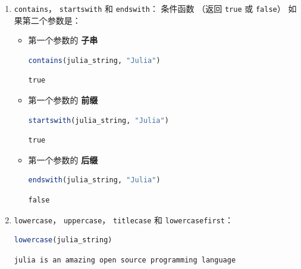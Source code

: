 \documentclass[
  notoc %
]{tufte-book}
\newcommand{\passthrough}[1]{#1}
\begin{document}
\begin{enumerate}
\def\labelenumi{\arabic{enumi}.}
\item
  \passthrough{\lstinline!contains!}，
  \passthrough{\lstinline!startswith!} 和
  \passthrough{\lstinline!endswith!}： 条件函数 （返回
  \passthrough{\lstinline!true!} 或 \passthrough{\lstinline!false!}）
  如果第二个参数是：

  \begin{itemize}
  \item
    第一个参数的 \textbf{子串}

    \begin{lstlisting}[language=Julia]
    contains(julia_string, "Julia")
    \end{lstlisting}

    \begin{lstlisting}[language=Output]
    true
    \end{lstlisting}
  \item
    第一个参数的 \textbf{前缀}

    \begin{lstlisting}[language=Julia]
    startswith(julia_string, "Julia")
    \end{lstlisting}

    \begin{lstlisting}[language=Output]
    true
    \end{lstlisting}
  \item
    第一个参数的 \textbf{后缀}

    \begin{lstlisting}[language=Julia]
    endswith(julia_string, "Julia")
    \end{lstlisting}

    \begin{lstlisting}[language=Output]
    false
    \end{lstlisting}
  \end{itemize}
\item
  \passthrough{\lstinline!lowercase!}，
  \passthrough{\lstinline!uppercase!}，
  \passthrough{\lstinline!titlecase!} 和
  \passthrough{\lstinline!lowercasefirst!}：

  \begin{lstlisting}[language=Julia]
  lowercase(julia_string)
  \end{lstlisting}

  \begin{lstlisting}[language=Output]
  julia is an amazing open source programming language
  \end{lstlisting}


\end{enumerate}
\end{document}
